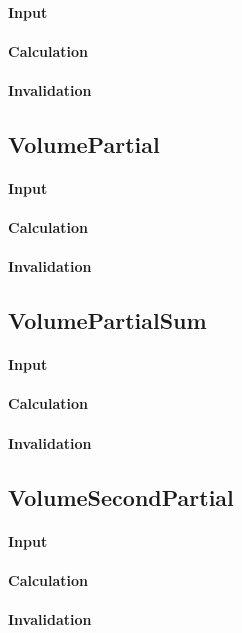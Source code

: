\paragraph{Input}

\paragraph{Calculation}

\paragraph{Invalidation}

\bigskip

\subsection{VolumePartial}

\paragraph{Input}

\paragraph{Calculation}

\paragraph{Invalidation}

\bigskip

\subsection{VolumePartialSum}

\paragraph{Input}

\paragraph{Calculation}

\paragraph{Invalidation}

\bigskip

\subsection{VolumeSecondPartial}

\paragraph{Input}

\paragraph{Calculation}

\paragraph{Invalidation}

\bigskip
